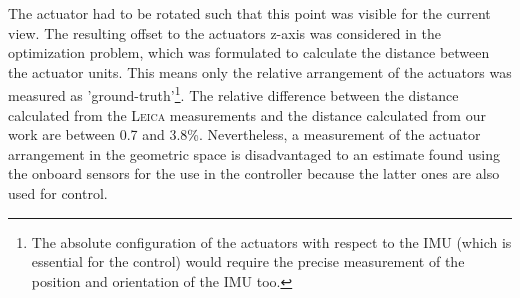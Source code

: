 The actuator had to be rotated such that this point was visible for the current view.
The resulting offset to the actuators z-axis was considered in the optimization problem,
which was formulated to calculate the distance between the actuator units.
This means only the relative arrangement of the actuators was measured as 'ground-truth'\footnote{
The absolute configuration of the actuators with respect to the IMU (which is essential for the control) would require the precise measurement of the position and orientation of the IMU too.}.
The relative difference between the distance calculated from the \textsc{Leica} measurements and the distance calculated from our work are between 0.7 and 3.8\%.
Nevertheless, a measurement of the actuator arrangement in the geometric space is disadvantaged to an estimate found using the onboard sensors for the use in the controller because the latter ones are also used for control.


%
